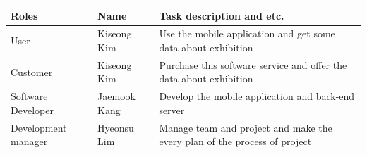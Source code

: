 \documentclass[conference]{IEEEtran}
\begin{document}
\begin{tabular}{|l|l|l|}\hline
 Roles& Name & Task description and etc. \\\hline\hline
User & Kiseong Kim & Use the mobile application and get some data about exhibition \\
Customer & Kiseong Kim & Purchase this software service and offer the data about exhibition \\
Software Developer & Jaemook Kang & Develop the mobile application and back-end server\\
Development manager & Hyeonsu Lim &  Manage team and project and make the every plan of the process of project\\\hline

\end{tabular}
\\\\\\\\\\\\\\\\\\\\\\\\\\\\\\\\\\\\\\\\\\\\\\\\\\\\\\\\\\\\\\\\\\\\\\\\\\\\\\\\\\\\\\\\\\\\\\\\\\\\\\\\\
\end{document}
